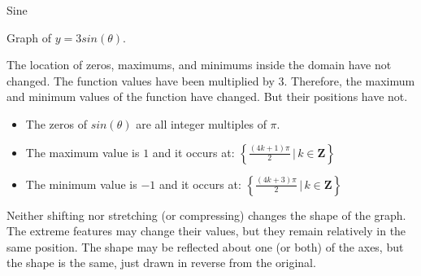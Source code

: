 \documentclass{ximera}
\begin{document}
\begin{example} Sine



Graph of $y = 3 sin(\theta)$.

\begin{image}
\end{image}


The location of zeros, maximums, and minimums inside the domain have not changed.  The function values have been multiplied by $3$. Therefore, the maximum and minimum values of the function have changed. But their positions have not.

\begin{itemize}
\item The zeros of $sin(\theta)$ are all integer multiples of $\pi$.
\item The maximum value is $1$ and it occurs at:  $\left\{     \frac{(4k+1)\pi}{2} \, | \, k \in \textbf{Z}     \right\}$
\item The minimum value is $-1$ and it occurs at:  $\left\{    \frac{(4k+3)\pi}{2} \, | \, k \in \textbf{Z}     \right\}$
\end{itemize}













\end{example}






Neither shifting nor stretching (or compressing) changes the shape of the graph.  The extreme features may change their values, but they remain relatively in the same position.  The shape may be reflected about one (or both) of the axes, but the shape is the same, just drawn in reverse from the original.
\end{document}
